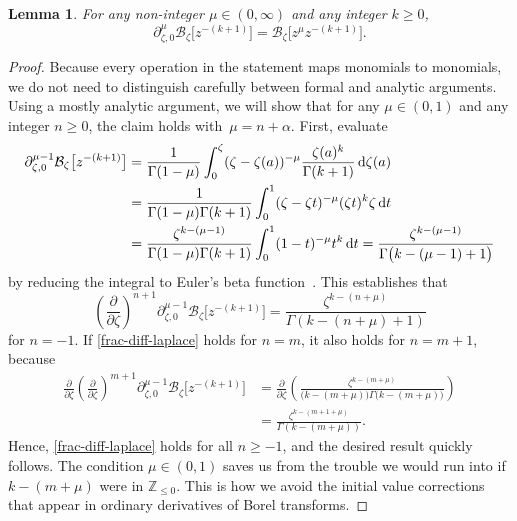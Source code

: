 \documentclass[pdftex]{sigma}
\newcommand{\Z}{\mathbb{Z}}
\newcommand{\borel}{\mathcal{B}}
\numberwithin{equation}{section}
\newtheorem{Lemma}[Theorem]{Lemma}
\begin{document}
\begin{Lemma}\label{lem:frac-deriv-Borel}
For any non-integer $\mu \in (0, \infty)$ and any integer $k \ge 0$,
\[
\partial^\mu_{\zeta,0} \borel_\zeta \bigl[z^{-(k+1)}\bigr] = \borel_\zeta \bigl[z^\mu z^{-(k+1)}\bigr].\]
\end{Lemma}
\begin{proof}
Because every operation in the statement maps monomials to monomials, we do not need to distinguish carefully between formal and analytic arguments. Using a mostly analytic argument, we will show that for any $\mu \in (0, 1)$ and any integer $n \ge 0$, the claim holds with~${\mu = n + \alpha}$. First, evaluate
\begin{align*}
\partial^{\mu-1}_{\zeta,0} \borel_\zeta \bigl[z^{-(k+1)}\bigr] & = \frac{1}{\Gamma(1-\mu)} \int_0^\zeta (\zeta-\zeta(a))^{-\mu} \frac{\zeta(a)^k}{\Gamma(k+1)} \,{\rm d}\zeta(a) \\
& = \frac{1}{\Gamma(1-\mu) \Gamma(k+1)} \int_0^1 (\zeta-\zeta t)^{-\mu} (\zeta t)^k \zeta \,{\rm d}t \\
& = \frac{\zeta^{k-(\mu-1)}}{\Gamma(1-\mu) \Gamma(k+1)} \int_0^1 (1-t)^{-\mu} t^k \,{\rm d}t = \frac{\zeta^{k-(\mu-1)}}{\Gamma\bigl(k-(\mu-1)+1\bigr)}
\end{align*}
by reducing the integral to Euler's beta function~\cite[identity (5.12.1)]{dlmf}. This establishes that
\begin{equation}\label{frac-diff-laplace}
\left(\frac{\partial}{\partial \zeta}\right)^{n+1} \partial^{\mu-1}_{\zeta,0} \borel_\zeta \bigl[z^{-(k+1)}\bigr] = \frac{\zeta^{k-(n+\mu)}}{\Gamma(k-(n+\mu)+1)}
\end{equation}
for $n = -1$. If \eqref{frac-diff-laplace} holds for $n = m$, it also holds for $n = m+1$, because
\begin{align*}
\frac{\partial}{\partial \zeta} \left(\frac{\partial}{\partial \zeta}\right)^{m+1} \partial^{\mu-1}_{\zeta,0} \borel_\zeta \bigl[z^{-(k+1)}\bigr] & = \frac{\partial}{\partial \zeta} \left( \frac{\zeta^{k-(m+\mu)}}{\bigl(k-(m+\mu)\bigr) \Gamma\bigl(k-(m+\mu)\bigr)} \right)\\
& = \frac{\zeta^{k-(m+1+\mu)}}{\Gamma(k-(m+\mu))}.
\end{align*}
Hence, \eqref{frac-diff-laplace} holds for all $n \ge -1$, and the desired result quickly follows. The condition $\mu \in (0, 1)$ saves us from the trouble we would run into if $k-(m+\mu)$ were in $\Z_{\le 0}$. This is how we avoid the initial value corrections that appear in ordinary derivatives of Borel transforms.
\end{proof}
\end{document}
